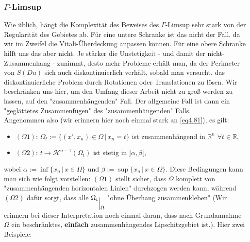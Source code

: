 \subsubsection{\(\Gamma\)-Limsup}
Wie üblich, hängt die Komplexität des Beweises des \(\Gamma\)-Limsup sehr stark von der \\Regularität des Gebietes ab. Für eine untere Schranke ist das nicht der Fall, da wir im Zweifel die Vitali-Überdeckung anpassen können. Für eine obere Schranke hilft uns das aber nicht. Je stärker die Unstetigkeit - und damit der nicht-Zusammenhang - zunimmt, desto mehr Probleme erhält man, da der Perimeter von \(S(Du)\) sich auch diskontinuierlich verhält, sobald man versucht, das diskontinuierliche Problem durch Rotationen oder Translationen zu lösen. Wir beschränken uns hier, um den Umfang dieser Arbeit nicht zu groß werden zu lassen, auf den "zusammenhängenden" Fall. Der allgemeine Fall ist dann ein "geglättetes Zusammenfügen" des "zusammenhängenden" Falls.\\
Angenommen also (wir erinnern hier noch einmal stark an \eqref{eq4.81}), es gilt:
\begin{itemize}
    \item \((\Omega 1)\): \(\Omega_t := \{(x',x_n) \in \Omega \, | \, x_n = t\}\) ist zusammenhängend in \(\mathbb{R}^n\) \(\forall t \in \mathbb{R}\),
    \item \((\Omega 2)\): \(t \mapsto \mathcal{H}^{n-1}(\Omega_t)\) ist stetig in \(]\alpha,\beta[\),
\end{itemize}
wobei \(\alpha := \inf \{x_n \, | \, x \in \Omega\}\) und \(\beta := \sup \{x_n \, | \, x \in \Omega\}\). Diese Bedingungen kann man sich wie folgt vorstellen: \((\Omega 1)\) stellt sicher, dass \(\Omega\) komplett von "zusammenhängenden horizontalen Linien" durchzogen werden kann, während \((\Omega 2)\) dafür sorgt, dass alle \({\Omega_t}_{\einschraenkung \Omega}\) "ohne Überhang zusammenkleben" (Wir erinnern bei dieser Interpretation noch einmal daran, dass nach Grundannahme \(\Omega\) ein beschränktes, \textbf{einfach} zusammenhängendes Lipschitzgebiet ist.). Hier zwei Beispiele:
